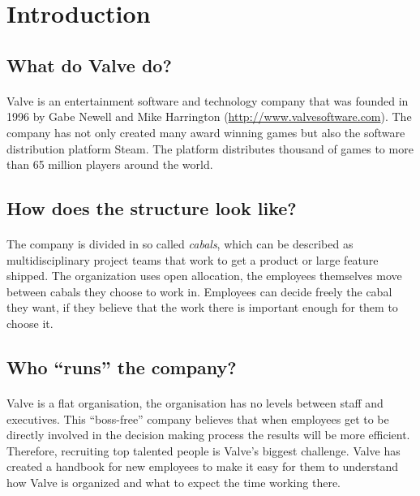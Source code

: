 \documentclass[12pt,twoside,notitle,a4paper]{article}
\begin{document}
\newpage
\section{Introduction}
\subsection{What do Valve do?}
\paragraph{}Valve is an entertainment software and technology company that was founded in 1996 by Gabe Newell and Mike Harrington (\url{http://www.valvesoftware.com}). The company has not only created many award winning games but also the software distribution platform Steam. The platform distributes thousand of games to more than 65 million players around the world.

\subsection{How does the structure look like?}
\paragraph{}The company is divided in so called \textit{cabals}, which can be described as multidisciplinary project teams that work to get a product or large feature shipped. The organization uses open allocation, the employees themselves move between cabals they choose to work in. Employees can decide freely the cabal they want, if they believe that the work there is important enough for them to choose it. 

\subsection{Who “runs” the company?}
\paragraph{}Valve is a flat organisation, the organisation has no levels between staff and executives. This “boss-free” company believes that when employees get to be directly involved in the decision making process the results will be more efficient. Therefore, recruiting top talented people is Valve’s biggest challenge. Valve has created a handbook for new employees to make it easy for them to understand how Valve is organized and what to expect the time working there. 
\end{document}
